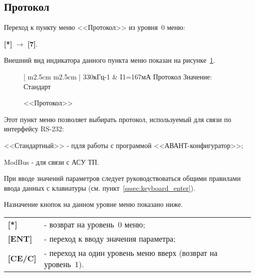 \subsection{Протокол}	\label{ssec:protocol}

Переход к пункту меню <<Протокол>> из уровня~0 меню: 

\textbf{[*]} $\rightarrow$ \textbf{[7]}.

Внешний вид индикатора данного пункта меню показан на рисунке~\ref{fig:protocol}.
 
 \begin{figure}[H]
 	\centering
 	
	\begin{tabular}{| m{2.5cm}  m{2.5cm} |}
		\firsthline
		330кГц-1	& \raggedleft I1=167мА			\tabularnewline 
		 {Протокол}				\tabularnewline
		 {Значение: Стандарт} 	\tabularnewline 
		 {}						\tabularnewline 
		\lasthline
	\end{tabular} 
	
	\caption{<<Протокол>>}
	\label{fig:protocol}
\end{figure}

Этот пункт меню позволяет выбирать протокол, используемый для связи по интерфейсу RS-232: 
\begin{list}{---}{}
	\item <<Стандартный>> - пдля работы с программой <<АВАНТ-конфигуратор>>;
	\item ModBus - для связи с АСУ ТП.
\end{list}

При вводе значений параметров следует руководствоваться общими правилами ввода данных с клавиатуры (см. пункт~\ref{sssec:keyboard_enter}).

Назначение кнопок на данном уровне меню показано ниже.
\begin{center}
	\begin{tabular}{p{2cm} p{15cm}}
		\textbf{[*]} 			& - возврат на уровень~0 меню; \tabularnewline
		\textbf{[ENT]} 			& - переход к вводу значения параметра; \tabularnewline
		\textbf{[CE/C]} 		& - переход на один уровень меню вверх (возврат на уровень~1). \tabularnewline				
	\end{tabular}
\end{center}